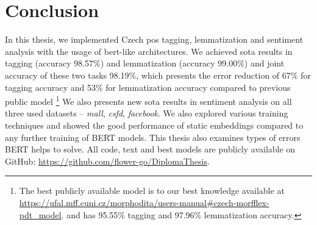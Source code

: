 \chapter*{Conclusion}
\label{chap:concl}
In this thesis, we implemented Czech \acrlong{pos} tagging, lemmatization and sentiment analysis with the usage of \acrlong{bert}-like architectures. We achieved \acrlong{sota} results in tagging (accuracy 98.57\%) and lemmatization (accuracy 99.00\%) and joint accuracy of these two tasks 98.19\%, which presents the error reduction of 67\% for tagging accuracy and 53\% for lemmatization accuracy compared to previous public model \citep{Strakova}\footnote{The best publicly available model is to our best knowledge available at \url{https://ufal.mff.cuni.cz/morphodita/users-manual\#czech-morfflex-pdt_model}. and has 95.55\% tagging and 97.96\% lemmatization accuracy.} We also presents new \acrlong{sota} results in sentiment analysis on all three used datasets -- \textit{mall}, \textit{csfd}, \textit{facebook}. We also explored various training techniques and showed the good performance of static embeddings compared to any further training of BERT models. This thesis also examines types of errors BERT helps to solve. All code, text and best models are publicly available on GitHub: \url{https://github.com/flower-go/DiplomaThesis}.
